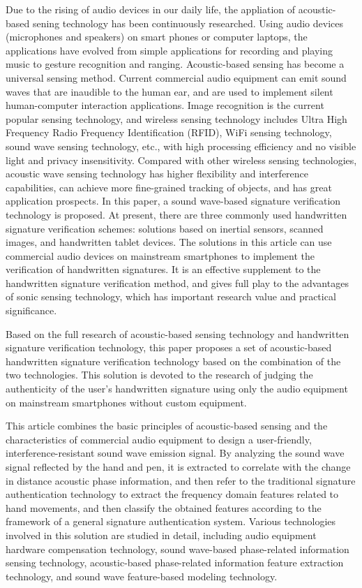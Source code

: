 \begin{englishabstract}

Due to the rising of audio devices in our daily life, the appliation of acoustic-based sening technology has been continuously researched. Using audio devices (microphones and speakers) on smart phones or computer laptops, the applications have evolved from simple applications for recording and playing music to gesture recognition and ranging. Acoustic-based sensing has become a universal sensing method. Current commercial audio equipment can emit sound waves that are inaudible to the human ear, and are used to implement silent human-computer interaction applications. Image recognition is the current popular sensing technology, and wireless sensing technology includes Ultra High Frequency Radio Frequency Identification (RFID), WiFi sensing technology, sound wave sensing technology, etc., with high processing efficiency and no visible light and privacy insensitivity. Compared with other wireless sensing technologies, acoustic wave sensing technology has higher flexibility and interference capabilities, can achieve more fine-grained tracking of objects, and has great application prospects. In this paper, a sound wave-based signature verification technology is proposed. At present, there are three commonly used handwritten signature verification schemes: solutions based on inertial sensors, scanned images, and handwritten tablet devices. The solutions in this article can use commercial audio devices on mainstream smartphones to implement the verification of handwritten signatures. It is an effective supplement to the handwritten signature verification method, and gives full play to the advantages of sonic sensing technology, which has important research value and practical significance.

Based on the full research of acoustic-based sensing technology and handwritten signature verification technology, this paper proposes a set of acoustic-based handwritten signature verification technology based on the combination of the two technologies. This solution is devoted to the research of judging the authenticity of the user's handwritten signature using only the audio equipment on mainstream smartphones without custom equipment.

This article combines the basic principles of acoustic-based sensing and the characteristics of commercial audio equipment to design a user-friendly, interference-resistant sound wave emission signal. By analyzing the sound wave signal reflected by the hand and pen, it is extracted to correlate with the change in distance acoustic phase information, and then refer to the traditional signature authentication technology to extract the frequency domain features related to hand movements, and then classify the obtained features according to the framework of a general signature authentication system. Various technologies involved in this solution are studied in detail, including audio equipment hardware compensation technology, sound wave-based phase-related information sensing technology, acoustic-based phase-related information feature extraction technology, and sound wave feature-based modeling technology.


\end{englishabstract}
